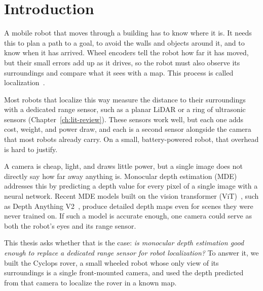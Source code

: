 \chapter{Introduction}
\label{ch:intro}
\setlength\parindent{24pt}



A mobile robot that moves through a building has to know where it is. It needs this to plan a
path to a goal, to avoid the walls and objects around it, and to know when it has arrived. Wheel
encoders tell the robot how far it has moved, but their small errors add up as it drives, so the
robot must also observe its surroundings and compare what it sees with a map. This process is
called localization~\cite{thrun2005probabilistic}.

Most robots that localize this way measure the distance to their surroundings with a dedicated
range sensor, such as a planar LiDAR or a ring of ultrasonic sensors
(Chapter~\ref{ch:lit-review}). These sensors work well, but each one adds cost, weight, and power
draw, and each is a second sensor alongside the camera that most robots already carry. On a
small, battery-powered robot, that overhead is hard to justify.

A camera is cheap, light, and draws little power, but a single image does not directly say how
far away anything is. Monocular depth estimation (MDE) addresses this by predicting a depth value
for every pixel of a single image with a neural network. Recent MDE models built on the vision
transformer (ViT)~\cite{ViT}, such as Depth Anything V2~\cite{DepthAnythingV2}, produce detailed
depth maps even for scenes they were never trained on. If such a model is accurate enough, one
camera could serve as both the robot's eyes and its range sensor.

This thesis asks whether that is the case: \emph{is monocular depth estimation good enough to
replace a dedicated range sensor for robot localization?} To answer it, we built the Cyclops
rover, a small wheeled robot whose only view of its surroundings is a single front-mounted
camera, and used the depth predicted from that camera to localize the rover in a known map.

